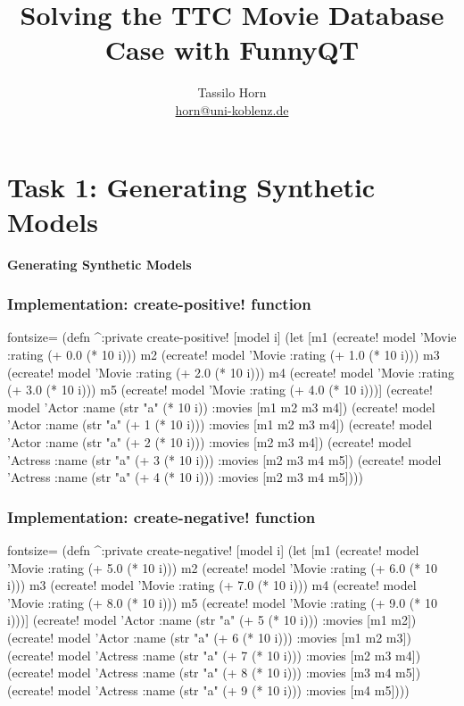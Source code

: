 \documentclass{beamer}
\title{Solving the TTC Movie Database Case with FunnyQT}
\author{Tassilo Horn\\
  \href{mailto:horn@uni-koblenz.de}{horn@uni-koblenz.de}}
\begin{document}
\maketitle{}

\section{Task 1: Generating Synthetic Models}

\begin{frame}
  \LARGE
  \begin{center}
    \textbf{Generating Synthetic Models}
  \end{center}
\end{frame}

\begin{frame}[fragile]
  \frametitle{Implementation: create-positive! function}
  \begin{clojurecode*}{fontsize=\tiny}
(defn ^:private create-positive! [model i]
  (let [m1 (ecreate! model 'Movie :rating (+ 0.0 (* 10 i)))
        m2 (ecreate! model 'Movie :rating (+ 1.0 (* 10 i)))
        m3 (ecreate! model 'Movie :rating (+ 2.0 (* 10 i)))
        m4 (ecreate! model 'Movie :rating (+ 3.0 (* 10 i)))
        m5 (ecreate! model 'Movie :rating (+ 4.0 (* 10 i)))]
    (ecreate! model 'Actor   :name (str "a" (* 10 i))       :movies [m1 m2 m3 m4])
    (ecreate! model 'Actor   :name (str "a" (+ 1 (* 10 i))) :movies [m1 m2 m3 m4])
    (ecreate! model 'Actor   :name (str "a" (+ 2 (* 10 i))) :movies [m2 m3 m4])
    (ecreate! model 'Actress :name (str "a" (+ 3 (* 10 i))) :movies [m2 m3 m4 m5])
    (ecreate! model 'Actress :name (str "a" (+ 4 (* 10 i))) :movies [m2 m3 m4 m5])))
  \end{clojurecode*}
\end{frame}

\begin{frame}[fragile]
  \frametitle{Implementation: create-negative! function}
  \begin{clojurecode*}{fontsize=\tiny}
(defn ^:private create-negative! [model i]
  (let [m1 (ecreate! model 'Movie :rating (+ 5.0 (* 10 i)))
        m2 (ecreate! model 'Movie :rating (+ 6.0 (* 10 i)))
        m3 (ecreate! model 'Movie :rating (+ 7.0 (* 10 i)))
        m4 (ecreate! model 'Movie :rating (+ 8.0 (* 10 i)))
        m5 (ecreate! model 'Movie :rating (+ 9.0 (* 10 i)))]
    (ecreate! model 'Actor   :name (str "a" (+ 5 (* 10 i))) :movies [m1 m2])
    (ecreate! model 'Actor   :name (str "a" (+ 6 (* 10 i))) :movies [m1 m2 m3])
    (ecreate! model 'Actress :name (str "a" (+ 7 (* 10 i))) :movies [m2 m3 m4])
    (ecreate! model 'Actress :name (str "a" (+ 8 (* 10 i))) :movies [m3 m4 m5])
    (ecreate! model 'Actress :name (str "a" (+ 9 (* 10 i))) :movies [m4 m5])))
  \end{clojurecode*}
\end{frame}
\end{document}
